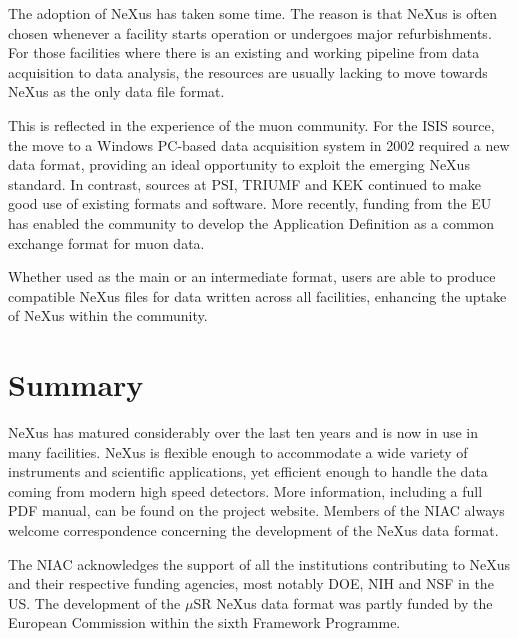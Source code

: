 \documentclass[%
 aip,
rsi,
 amsmath,amssymb,
 reprint,%
]{revtex4-1}
\begin{document}
The adoption of NeXus has taken some time. The reason is that NeXus is often chosen whenever 
a facility starts operation or undergoes major refurbishments. For those facilities where there is an existing and working 
pipeline from data acquisition to data analysis,  the resources are usually lacking to move 
towards NeXus as the only data file format.

This is reflected in the experience of the muon community. For the ISIS source, the move to a Windows PC-based data acquisition 
system in 2002 required a new data format, providing an ideal opportunity to exploit the emerging NeXus standard\cite{muon1}. In 
contrast, sources at PSI, TRIUMF and KEK continued to make good use of existing formats and software. More recently, funding 
from the EU has enabled the community to develop the Application Definition as a common exchange format for muon data\cite{muon2}. 

Whether used as the main or an intermediate format, users are able to produce compatible NeXus files for data written 
across all facilities, enhancing the uptake of NeXus within the community.


\section{Summary}

NeXus has matured considerably over the last ten years and is now in use in many facilities. NeXus 
is flexible enough to accommodate a wide variety of instruments and scientific applications,
yet efficient enough to handle the data coming from modern high speed detectors.
More information, including a full PDF manual, can be found on the project 
website\cite{nxwww}.  Members of the NIAC\cite{niac}
always welcome correspondence concerning the development of the NeXus data format.

\begin{acknowledgments}
The NIAC acknowledges the support of all the institutions contributing to NeXus and their respective 
funding agencies, most notably DOE, NIH and NSF in the US. The development of the $\mu$SR NeXus data format was partly 
funded by the European Commission within the sixth Framework Programme. 
\end{acknowledgments}

\nocite{*}
\end{document}
